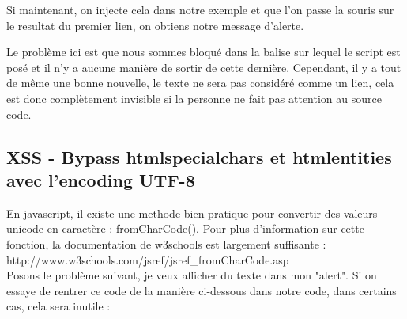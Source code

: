 \documentclass{article}
\begin{document}
Si maintenant, on injecte cela dans notre exemple et que l'on passe la souris sur le resultat du premier lien, on obtiens notre message d'alerte.
\vspace{0.2cm}\\
\vspace{0.2cm}

Le problème ici est que nous sommes bloqué dans la balise sur lequel le script est posé et il n'y a aucune manière de sortir de cette dernière. Cependant, il y a tout de même une bonne nouvelle, le texte ne sera pas considéré comme un lien, cela est donc complètement invisible si la personne ne fait pas attention au source code.

\subsection{XSS - Bypass htmlspecialchars et htmlentities avec l'encoding UTF-8}

En javascript, il existe une methode bien pratique pour convertir des valeurs unicode en caractère : fromCharCode(). Pour plus d'information sur cette fonction, la documentation de w3schools est largement suffisante : http://www.w3schools.com/jsref/jsref\_fromCharCode.asp\\

Posons le problème suivant, je veux afficher du texte dans mon "alert". Si on essaye de rentrer ce code de la manière ci-dessous dans notre code, dans certains cas, cela sera inutile :
\vspace{0.2cm}\\
\vspace{0.2cm}
\end{document}
